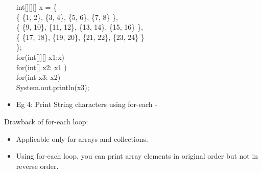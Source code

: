 \begin{flushleft}
\begin{itemize}
{			int[][][] x = \{ \\
			\s	\{ \{1, 2\}, \{3, 4\}, \{5, 6\}, \{7, 8\} \}, \\
			\s	\{ \{9, 10\}, \{11, 12\}, \{13, 14\}, \{15, 16\} \}, \\
			\s	\{ \{17, 18\}, \{19, 20\}, \{21, 22\}, \{23, 24\} \} \\
			\}; \\
			for(int[]][] x1:x)  \\
			\s for(int[] x2: x1 )  \\
			\s \s for(int x3: x2)  \\
			\s \s \s System.out.println(x3); 
		}
		
		\item Eg 4: Print String characters using for-each -
		\bigskip
		
	\end{itemize}


	Drawback of for-each loop:
	\begin{itemize}
		\item Applicable only for arrays and collections.
		\item Using for-each loop, you can print array elements in original order but not in reverse order.	
	\end{itemize}
	
\end{flushleft}

